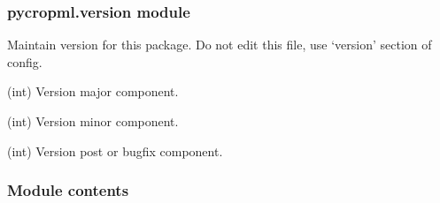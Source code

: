\documentclass[letterpaper,10pt,english]{sphinxmanual}
\begin{document}
\subsubsection{pycropml.version module}
\label{\detokenize{_dvlpt/pycropml:pycropml-version-module}}\label{\detokenize{_dvlpt/pycropml:module-pycropml.version}}
Maintain version for this package.
Do not edit this file, use ‘version’ section of config.

\begin{fulllineitems}
\label{\detokenize{_dvlpt/pycropml:pycropml.version.MAJOR}}
(int) Version major component.

\end{fulllineitems}


\begin{fulllineitems}
\label{\detokenize{_dvlpt/pycropml:pycropml.version.MINOR}}
(int) Version minor component.

\end{fulllineitems}


\begin{fulllineitems}
\label{\detokenize{_dvlpt/pycropml:pycropml.version.POST}}
(int) Version post or bugfix component.

\end{fulllineitems}



\subsubsection{Module contents}
\label{\detokenize{_dvlpt/pycropml:module-contents}}\label{\detokenize{_dvlpt/pycropml:module-pycropml}}

\section{}
\label{\detokenize{user/usecases:usecases}}\label{\detokenize{user/usecases::doc}}
\end{document}
